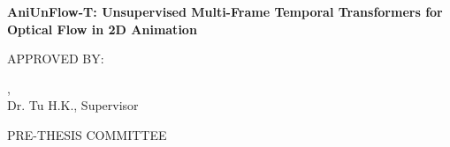\begin{center}

\Large
\textbf{AniUnFlow-T: Unsupervised Multi-Frame Temporal Transformers for Optical Flow in 2D Animation}


\vspace{3cm}

\large
APPROVED BY:\\
\vspace{1cm}

\underline{\hspace{5cm}},\\
Dr. Tu H.K., Supervisor \\
\vspace{1cm}



\vspace{3cm}

PRE-THESIS COMMITTEE
    
\end{center}







\pagebreak